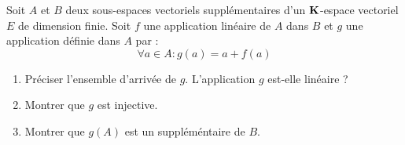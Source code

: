 Soit $A$ et $B$ deux sous-espaces vectoriels supplémentaires d'un $\mathbf{K}$-espace vectoriel $E$ de dimension finie. Soit $f$ une application linéaire de $A$ dans $B$ et $g$ une application définie dans $A$ par :
\begin{displaymath}
 \forall a \in A : g(a)= a +f(a)
\end{displaymath}
\begin{enumerate}
 \item Préciser l'ensemble d'arrivée de $g$. L'application $g$ est-elle linéaire ?
\item Montrer que $g$ est injective.
\item Montrer que $g(A)$ est un suppléméntaire de $B$.
\end{enumerate}
